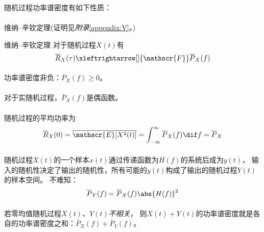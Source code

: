     随机过程功率谱密度有如下性质：
    \vspace{-1ex}
    
    \paragraph{}{维纳--辛钦定理(证明见\emph{附录}\ref{appendix:V}。)}
    \begin{mythm}{维纳--辛钦定理}
        对于随机过程$X(t)$有
        \begin{equation}
            \overline{R}_X(\tau)\xleftrightarrow[]{\mathscr{F}}\overline{P}_X(f)
        \end{equation}
    \end{mythm}

    \paragraph{}功率谱密度非负：$\overline{P}_X(f)\geq 0$。

    \paragraph{}对于实随机过程，$\overline{P}_X(f)$是偶函数。

    \paragraph{}随机过程的平均功率为
    \begin{equation}
        \overline{R}_X(0)=\overline{\mathscr{E}[X^2(t)]}=\int_{-\infty}^{\infty}\overline{P}_X(f)\dif f=\overline{P}_X
    \end{equation}

    \paragraph{}随机过程$X(t)$的一个样本$x(t)$通过传递函数为$H(f)$的系统后成为$y(t)$，
    输入的随机性决定了输出的随机性，所有可能的$y(t)$构成了输出的随机过程$Y(t)$的样本空间。
    不难知：
    \begin{equation}
        \overline{P}_Y(f)=\overline{P}_X(f)\abs{H(f)}^2
    \end{equation}

    \paragraph{}若零均值随机过程$X(t)$、$Y(t)$\emph{不相关}，
    则$X(t)+Y(t)$的功率谱密度就是各自的功率谱密度之和：$\overline{P}_X(f)+\overline{P}_Y(f)$。

